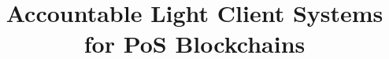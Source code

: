 \documentclass[llncs, nonacm=true]{acmart}
\begin{document}


\title{Accountable Light Client Systems for PoS Blockchains}






\renewcommand{\shortauthors}{Anonymous et al.}


\newtheorem{claim}[theorem]{Claim}
\newtheorem{remark}[theorem]{Remark}
\newtheorem{construction}[theorem]{Instantiation}
\newtheorem{assumption}[theorem]{Assumption}
\newtheorem{test_claim}[theorem]{Claim}
\newtheorem{observation}[theorem]{Observation}
\end{document}
